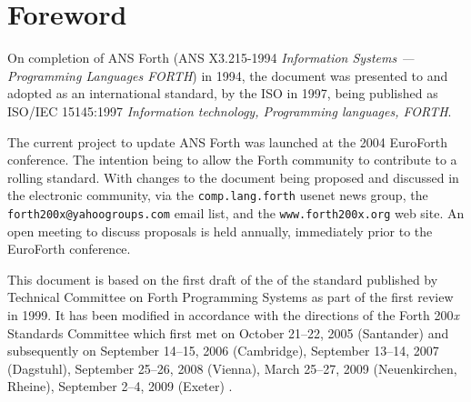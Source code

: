 \chapter*{Foreword}
\label{foreword}

On completion of ANS Forth (ANS X3.215-1994 \emph{Information Systems
--- Programming Languages FORTH}) in 1994, the document was presented
to and adopted as an international standard, by the ISO in 1997, being
published as ISO/IEC 15145:1997 \emph{Information technology,
Programming languages, FORTH}.

The current project to update ANS Forth was launched at the 2004
EuroForth conference.  The intention being to allow the Forth community
to contribute to a rolling standard.  With changes to the document
being proposed and discussed in the electronic community, via the
\texttt{comp.lang.forth} usenet news group, the
\texttt{forth200x@yahoogroups.com} email list, and the
\texttt{www.forth200x.org} web site.  An open meeting to discuss
proposals is held annually, immediately prior to the EuroForth
conference.

This document is based on the first draft of the of the standard
published by Technical Committee on Forth Programming Systems as part
of the first review in 1999. It has been modified in accordance with
the directions of the Forth 200\emph{x} Standards Committee which first
met on October 21--22, 2005 (Santander) and subsequently on
September 14--15, 2006 (Cambridge),
September 13--14, 2007 (Dagstuhl),
September 25--26, 2008 (Vienna),
March 25--27, 2009 (Neuenkirchen, Rheine),
September 2--4, 2009 (Exeter)%
.
